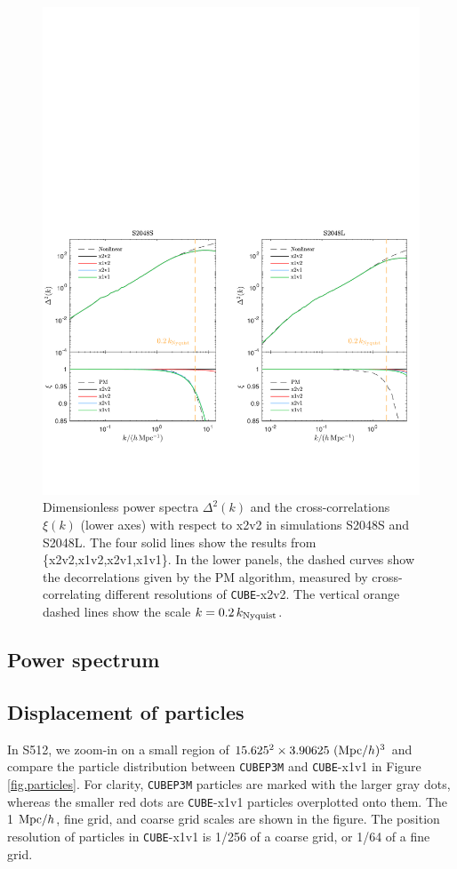 \documentclass[10pt,twocolumn,reprint]{emulateapj}
\begin{document}
\begin{figure}
\centering
  \includegraphics[width=1.0\linewidth]{f9}
 \caption{Dimensionless power spectra $\Delta^2(k)$ and the cross-correlations $\xi(k)$ (lower axes) with respect to x2v2 in simulations S2048S and S2048L. The four solid lines show the results from \{x2v2,x1v2,x2v1,x1v1\}. In the lower panels, the dashed curves show the decorrelations given by the PM algorithm, measured by cross-correlating different resolutions of {\tt CUBE}-x2v2. The vertical orange dashed lines show the scale $k=0.2\, k_{\rm Nyquist}$.}
\label{fig.ccc}
\end{figure}
\subsection{Power spectrum}

\subsection{Displacement of particles}
In S512, we zoom-in on a small region of $15.625^2\times 3.90625\ ({\rm Mpc}/h)^3$ and compare the particle distribution between {\tt CUBEP3M} and {\tt CUBE}-x1v1 in Figure \ref{fig.particles}. For clarity, {\tt CUBEP3M} particles are marked with the larger gray dots, whereas the smaller red dots are {\tt CUBE}-x1v1 particles overplotted onto them. The 1 ${\rm Mpc}/h$, fine grid, and coarse grid scales are shown in the figure. The position resolution of particles in {\tt CUBE}-x1v1 is 1/256 of a coarse grid, or 1/64 of a fine grid.
\end{document}
